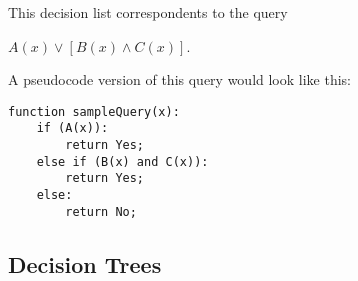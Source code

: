 \documentclass[english]{panikzettel}
\begin{document}
\begin{halfboxl}
\vspace{-\baselineskip}
\begin{center}
\end{center}

This decision list correspondents to the query
\begin{center}
    $A(x) \lor [B(x) \land C(x)]$.
\end{center}

\end{halfboxl}%
\begin{halfboxr}
\vspace{-\baselineskip}
A pseudocode version of this query would look like this:
\begin{lstlisting}
function sampleQuery(x):
    if (A(x)):
        return Yes;
    else if (B(x) and C(x)):
        return Yes;
    else:
        return No;
\end{lstlisting}
\end{halfboxr}

\subsection{Decision Trees}
\end{document}
